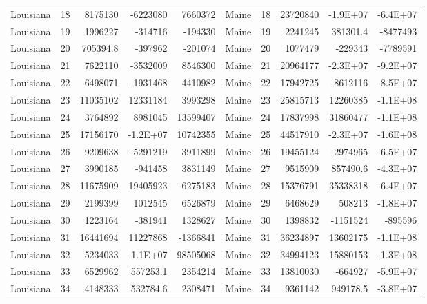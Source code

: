 \begin{table}[]
\begin{tabular}{lrrrrlrrrr}
		Louisiana &  18 & 8175130 & -6223080 & 7660372 & Maine &  18 & 23720840 & -1.9E+07 & -6.4E+07 \\
		Louisiana &  19 & 1996227 & -314716 & -194330 & Maine &  19 & 2241245 & 381301.4 & -8477493 \\
		Louisiana &  20 & 705394.8 & -397962 & -201074 & Maine &  20 & 1077479 & -229343 & -7789591 \\
		Louisiana &  21 & 7622110 & -3532009 & 8546300 & Maine &  21 & 20964177 & -2.3E+07 & -9.2E+07 \\
		Louisiana &  22 & 6498071 & -1931468 & 4410982 & Maine &  22 & 17942725 & -8612116 & -8.5E+07 \\
		Louisiana &  23 & 11035102 & 12331184 & 3993298 & Maine &  23 & 25815713 & 12260385 & -1.1E+08 \\
		Louisiana &  24 & 3764892 & 8981045 & 13599407 & Maine &  24 & 17837998 & 31860477 & -1.1E+08 \\
		Louisiana &  25 & 17156170 & -1.2E+07 & 10742355 & Maine &  25 & 44517910 & -2.3E+07 & -1.6E+08 \\
		Louisiana &  26 & 9209638 & -5291219 & 3911899 & Maine &  26 & 19455124 & -2974965 & -6.5E+07 \\
		Louisiana &  27 & 3990185 & -941458 & 3831149 & Maine &  27 & 9515909 & 857490.6 & -4.3E+07 \\
		Louisiana &  28 & 11675909 & 19405923 & -6275183 & Maine &  28 & 15376791 & 35338318 & -6.4E+07 \\
		Louisiana &  29 & 2199399 & 1012545 & 6526879 & Maine &  29 & 6468629 & 508213 & -1.8E+07 \\
		Louisiana &  30 & 1223164 & -381941 & 1328627 & Maine &  30 & 1398832 & -1151524 & -895596 \\
		Louisiana &  31 & 16441694 & 11227868 & -1366841 & Maine &  31 & 36234897 & 13602175 & -1.1E+08 \\
		Louisiana &  32 & 5234033 & -1.1E+07 & 98505068 & Maine &  32 & 34994123 & 15880153 & -1.3E+08 \\
		Louisiana &  33 & 6529962 & 557253.1 & 2354214 & Maine &  33 & 13810030 & -664927 & -5.9E+07 \\
		Louisiana &  34 & 4148333 & 532784.6 & 2308471 & Maine &  34 & 9361142 & 949178.5 & -3.8E+07
	\end{tabular}
\end{table}


